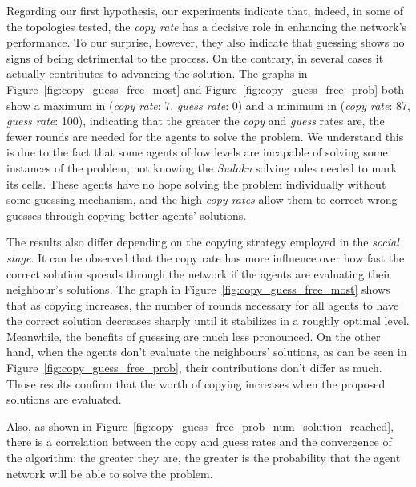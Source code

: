 \documentclass{article}
\begin{document}
Regarding our first hypothesis, our experiments indicate that, indeed, in some of the topologies tested, the {\em copy rate} has a decisive role in enhancing the network's performance. To our surprise, however, they also indicate that guessing shows no signs of being detrimental to the process. On the contrary, in several cases it actually contributes to advancing the solution. The graphs in Figure~\ref{fig:copy_guess_free_most} and Figure~\ref{fig:copy_guess_free_prob} both show a maximum in ({\em copy rate}: 7, {\em guess rate}: 0) and a minimum in ({\em copy rate}: 87, {\em guess rate}: 100), indicating that the greater the {\em copy} and {\em guess} rates are, the fewer rounds are needed for the agents to solve the problem. We understand this is due to the fact that some agents of low levels are incapable of solving some instances of the problem, not knowing the {\em Sudoku} solving rules needed to mark its cells. These agents have no hope solving the problem individually without some guessing mechanism, and the high {\em copy rates} allow them to correct wrong guesses through copying better agents' solutions.

The results also differ depending on the copying strategy employed in the \emph{social stage}. It can be observed that the copy rate has more influence over how fast the correct solution spreads through the network if the agents are evaluating their neighbour's solutions. The graph in Figure~\ref{fig:copy_guess_free_most} shows that as copying increases, the number of rounds necessary for all agents to have the correct solution decreases sharply until it stabilizes in a roughly optimal level. Meanwhile, the benefits of guessing are much less pronounced. On the other hand, when the agents don't evaluate the neighbours' solutions, as can be seen in Figure~\ref{fig:copy_guess_free_prob}, their contributions don't differ as much. Those results confirm that the worth of copying increases when the proposed solutions are evaluated.

Also, as shown in Figure~\ref{fig:copy_guess_free_prob_num_solution_reached}, there is a correlation between the copy and guess rates and the convergence of the algorithm: the greater they are, the greater is the probability that the agent network will be able to solve the problem.
\end{document}
